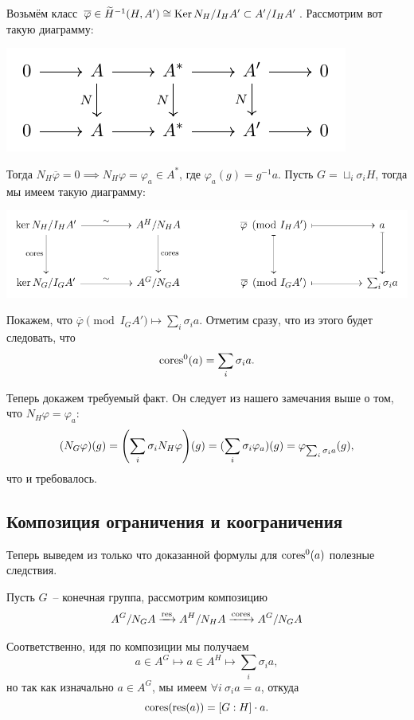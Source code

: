 	 Возьмём класс $\overline{\varphi} \in \widetilde{H}^{-1}(H, A') \cong \operatorname{Ker}{N_H}/I_{H}A' \subset A'/I_H A'$. Рассмотрим вот такую диаграмму: 

	 \begin{center}
	 	\includegraphics{lectures/6/pictures/cd_17.pdf}
	 \end{center}

	 Тогда $N_{H}\overline{\varphi} = 0 \implies N_H \varphi = \varphi_{a} \in A^*$, где $\varphi_a(g) = g^{-1}a$.  Пусть $G = \sqcup_{i} \sigma_i H$, тогда мы имеем такую диаграмму: 
	 \begin{center}
	 	\includegraphics{lectures/6/pictures/cd_18.pdf}
	 \end{center}

	 Покажем, что $\overline{\varphi} \pmod{I_{G} A'} \mapsto \sum_{i} \sigma_i a$. Отметим сразу, что из этого будет следовать, что 
	 \[
	 	\operatorname{cores}^0(a) = \sum_{i} \sigma_i a.
	 \]

	 Теперь докажем требуемый факт. Он следует из нашего замечания выше о том, что $N_H \varphi = \varphi_a$:
	 \[
	 	(N_{G}\varphi)(g) = \lr*{\sum_{i}\sigma_i N_{H}\varphi}(g) = (\sum_{i}\sigma_i \varphi_a)(g) = \varphi_{\sum_i \sigma_i a}(g),
	 \]
	 что и требовалось. 

	 \subsection{Композиция ограничения и коограничения}

	 Теперь выведем из только что доказанной формулы для $\operatorname{cores}^0(a)$  полезные следствия. 

	 Пусть $G$~-- конечная группа, рассмотрим композицию
	 \[
		A^{G}/N_{G}A \xrightarrow{\operatorname{res}} A^H/N_{H}A \xrightarrow{\operatorname{cores}} A^{G}/N_{G}A	 	
	 \]

	 Соответственно, идя по композиции мы получаем
	 \[
	 	a \in A^{G} \mapsto a \in A^H \mapsto \sum_{i} \sigma_{i} a,
	 \]
	 но так как изначально $a \in A^G$, мы имеем $\forall i \ \sigma_i a = a$, откуда 
	 \[
	 	\operatorname{cores}(\operatorname{res}(a)) = [G : H] \cdot a.
	 \]

